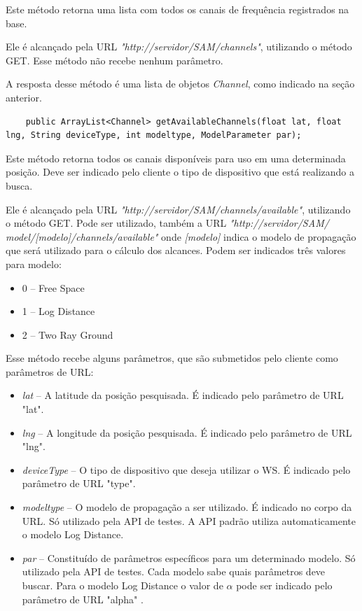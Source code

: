 Este método retorna uma lista com todos os canais de frequência registrados na base.

Ele é alcançado pela URL \textit{"http://servidor/SAM/channels"}, utilizando o método GET. Esse método não recebe nenhum parâmetro.

A resposta desse método é uma lista de objetos \textit{Channel}, como indicado na seção anterior.

\begin{lstlisting}
	public ArrayList<Channel> getAvailableChannels(float lat, float lng, String deviceType, int modeltype, ModelParameter par);
\end{lstlisting}

Este método retorna todos os canais disponíveis para uso em uma determinada posição. Deve ser indicado pelo cliente o tipo de dispositivo que está realizando a busca.

Ele é alcançado pela URL \textit{"http://servidor/SAM/channels/available"}, utilizando o método GET. Pode ser utilizado, também a URL \textit{"http://servidor/SAM/ model/[modelo]/channels/available"} onde \textit{[modelo]} indica o modelo de propagação que será utilizado para o cálculo dos alcances. Podem ser indicados três valores para modelo:

\begin{itemize}
\item 0 -- Free Space
\item 1 -- Log Distance
\item 2 -- Two Ray Ground
\end{itemize}

Esse método recebe alguns parâmetros, que são submetidos pelo cliente como parâmetros de URL:

\begin{itemize}
\item \textit{lat} -- A latitude da posição pesquisada. É indicado pelo parâmetro de URL "lat".
\item \textit{lng} -- A longitude da posição pesquisada. É indicado pelo parâmetro de URL "lng".
\item \textit{deviceType} -- O tipo de dispositivo que deseja utilizar o WS. É indicado pelo parâmetro de URL "type".
\item \textit{modeltype} -- O modelo de propagação a ser utilizado. É indicado no corpo da URL. Só utilizado pela API de testes. A API padrão utiliza automaticamente o modelo Log Distance.
\item \textit{par} -- Constituído de parâmetros específicos para um determinado modelo. Só utilizado pela API de testes. Cada modelo sabe quais parâmetros deve buscar. Para o modelo Log Distance o valor de \begin{math} \alpha \end{math} pode ser indicado pelo parâmetro de URL "alpha" .
\end{itemize}

